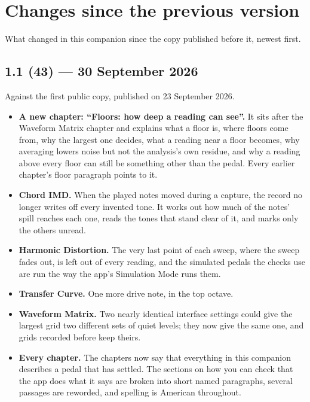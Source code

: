 \clearpage
\section*{Changes since the previous version}
What changed in this companion since the copy published before it, newest
first.

\subsection*{1.1 (43) --- 30 September 2026}
Against the first public copy, published on 23 September 2026.
\begin{itemize}
  \item \textbf{A new chapter: ``Floors: how deep a reading can see''.}
  It sits after the Waveform Matrix chapter and explains what a floor is,
  where floors come from, why the largest one decides, what a reading
  near a floor becomes, why averaging lowers noise but not the analysis's
  own residue, and why a reading above every floor can still be something
  other than the pedal. Every earlier chapter's floor paragraph points to
  it.
  \item \textbf{Chord IMD.} When the played notes moved during a capture,
  the record no longer writes off every invented tone. It works out how
  much of the notes' spill reaches each one, reads the tones that stand
  clear of it, and marks only the others unread.
  \item \textbf{Harmonic Distortion.} The very last point of each sweep,
  where the sweep fades out, is left out of every reading, and the
  simulated pedals the checks use are run the way the app's Simulation
  Mode runs them.
  \item \textbf{Transfer Curve.} One more drive note, in the top octave.
  \item \textbf{Waveform Matrix.} Two nearly identical interface settings
  could give the largest grid two different sets of quiet levels; they
  now give the same one, and grids recorded before keep theirs.
  \item \textbf{Every chapter.} The chapters now say that everything in
  this companion describes a pedal that has settled. The sections on how
  you can check that the app does what it says are broken into short
  named paragraphs, several passages are reworded, and spelling is
  American throughout.
\end{itemize}
